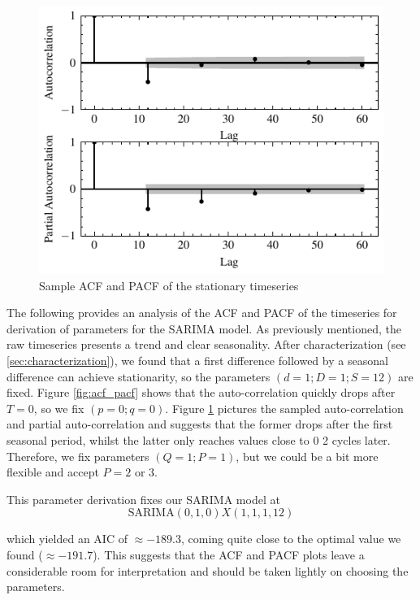 \documentclass[conference]{IEEEtran}
\begin{document}
\begin{figure}[hbtp]
    \centering
    \includegraphics{../figs/sacf_spacf.pdf}
    \caption{Sample ACF and PACF of the stationary timeseries}
    \label{fig:sacf_spacf}
\end{figure}

The following provides an analysis of the ACF and PACF of the timeseries for derivation of parameters for the SARIMA model. As previously mentioned, the raw timeseries presents a trend and clear seasonality. After characterization (see \ref{sec:characterization}), we found that a first difference followed by a seasonal difference can achieve stationarity, so the parameters $(d=1;D=1;S=12)$ are fixed. Figure \ref{fig:acf_pacf} shows that the auto-correlation quickly drops after $T=0$, so we fix $(p=0;q=0)$. Figure \ref{fig:sacf_spacf} pictures the sampled auto-correlation and partial auto-correlation and suggests that the former drops after the first seasonal period, whilst the latter only reaches values close to $0$ 2 cycles later. Therefore, we fix parameters $(Q=1;P=1)$, but we could be a bit more flexible and accept $P=2$ or $3$.

This parameter derivation fixes our SARIMA model at
\[
    \text{SARIMA}(0,1,0)X(1,1,1,12)
\]

which yielded an AIC of $\approx -189.3$, coming quite close to the optimal value we found ($\approx -191.7$). This suggests that the ACF and PACF plots leave a considerable room for interpretation and should be taken lightly on choosing the parameters.
\end{document}
